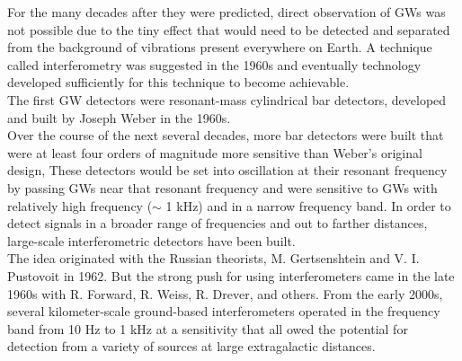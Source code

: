 \documentclass[binding=0.6cm, LaM]{sapthesis}
\begin{document}
	For the many decades after they were predicted, direct observation of GWs was not possible 
	due to the tiny effect that would need to be detected and separated from the background of vibrations present everywhere on Earth.
	A technique called interferometry was suggested in the 1960s and eventually technology developed  
	sufficiently for this technique to become achievable. \\
	The first GW detectors were resonant-mass cylindrical bar detectors, 
	developed and built by Joseph Weber in the 1960s. \\
	Over the course of the next several decades, more bar detectors were built that were at least 
	four orders of magnitude more sensitive than Weber’s original design, 
	These detectors would be set into oscillation at their resonant frequency by passing GWs 
	near that resonant frequency and were sensitive to GWs with relatively high frequency ($\sim$ 1 kHz) 
	and in a narrow frequency band. In order to detect signals in a broader range of frequencies and out to farther distances, 
	large-scale interferometric detectors have been built. \\ 
	The idea originated with the Russian theorists, M. Gertsenshtein and V. I. Pustovoit in 1962. 
	But the strong push for using interferometers came in the late 1960s with R. Forward, R. Weiss, 
	R. Drever, and others. From the early 2000s, several kilometer-scale ground-based interferometers 
	operated in the frequency band from 10 Hz to 1 kHz at a sensitivity that all
	owed the potential for detection from a variety of sources at large extragalactic distances.
\end{document}
